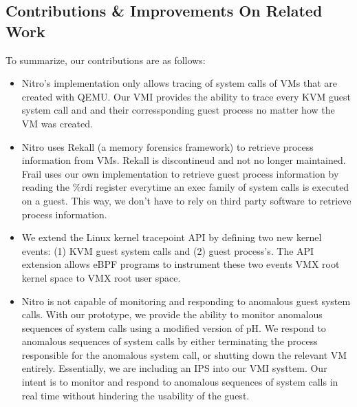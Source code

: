 \documentclass{report}
\begin{document}
\begin{spacing}{1.5}
\chapter{Contributions \& Improvements On Related Work}

{\large
To summarize, our contributions are as follows:

\begin{itemize}
  \item Nitro's implementation only allows tracing of system calls of VMs that are created with QEMU. Our VMI provides the ability to trace every KVM guest system call and and their corressponding guest process no matter how the VM was created.

  \item Nitro uses Rekall (a memory forensics framework) to retrieve process information from VMs. Rekall is discontineud and not no longer maintained. Frail uses our own implementation to retrieve guest process information by reading the \%rdi register everytime an exec family of system calls is executed on a guest. This way, we don't have to rely on third party software to retrieve process information.
  
  \item We extend the Linux kernel tracepoint API by defining two new kernel events: (1) KVM guest system calls and (2) guest process's. The API extension allows eBPF programs to instrument these two events VMX root kernel space to VMX root user space.
  
  \item Nitro is not capable of monitoring and responding to anomalous guest system calls. With our prototype, we provide the ability to monitor anomalous sequences of system calls using a modified version of pH. We respond to anomalous sequences of system calls by either terminating the process responsible for the anomalous system call, or shutting down the relevant VM entirely. Essentially, we are including an IPS into our VMI systtem. Our intent is to monitor and respond to anomalous sequences of system calls in real time without hindering the usability of the guest.
\newline
\end{itemize}
}


























\end{spacing}
\end{document}
